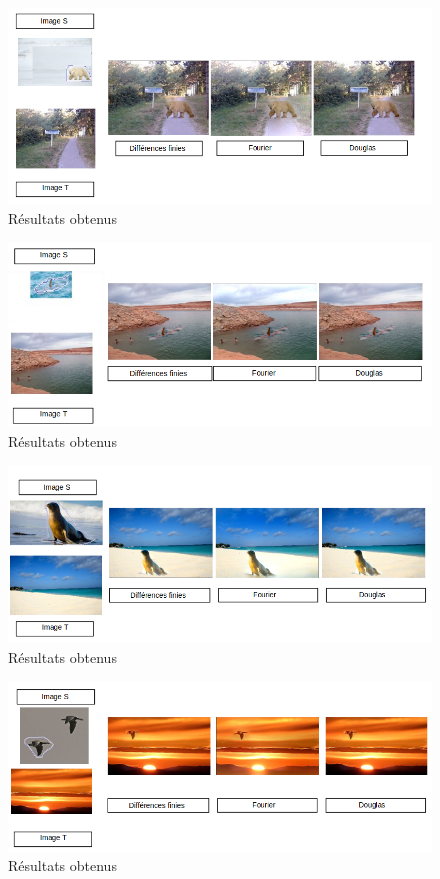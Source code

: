\begin{figure}[!h]
\centering
\includegraphics[scale=0.5]{Images/Resultats/4.png}
\caption{Résultats obtenus}
\end{figure}
\begin{figure}[!h]
\centering
\includegraphics[scale=0.5]{Images/Resultats/5.png}
\caption{Résultats obtenus}
\end{figure}
\begin{figure}[!h]
\centering
\includegraphics[scale=0.5]{Images/Resultats/6.png}
\caption{Résultats obtenus}
\end{figure}
\begin{figure}[!h]
\centering
\includegraphics[scale=0.5]{Images/Resultats/7.png}
\caption{Résultats obtenus}
\end{figure}

